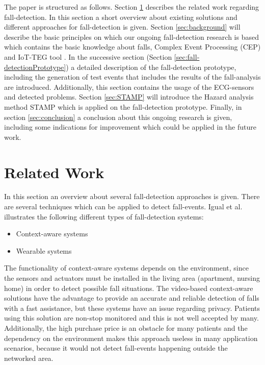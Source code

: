 \documentclass[review]{elsarticle}
\begin{document}
The paper is structured as follows. Section \ref{sec:relatedwork} describes the related work regarding fall-detection. In this section a short overview about existing solutions and different approaches for fall-detection is given. Section \ref{sec:background} will describe the basic principles on which our ongoing fall-detection research is based which contains the basic knowledge about falls, Complex Event Processing (CEP) \cite{Esper:2016} and IoT-TEG tool \cite{Gutierrez2017, TesisGutierrez2017}. In the successive section (Section \ref{sec:fall-detectionPrototype}) a detailed description of the fall-detection prototype, including the generation of test events that includes the results of the fall-analysis are introduced. Additionally, this section contains the usage of the ECG-sensors and detected problems. Section \ref{sec:STAMP} will introduce the Hazard analysis method STAMP \cite{leveson2011engineering} which is applied on the fall-detection prototype.
Finally, in section \ref{sec:conclusion} a conclusion about this ongoing research is given, including some indications for improvement which could be applied in the future work.

\section{Related Work}
\label{sec:relatedwork}
In this section an overview about several fall-detection approaches is given. There are several techniques which can be applied to detect fall-events. Igual et al. \cite{Igual2013} illustrates the following different types of fall-detection  systems:
\begin{itemize}
	\item Context-aware systems
	\item Wearable systems
\end{itemize}
The functionality of context-aware systems depends on the environment, since the sensors and actuators must be installed in the living area (apartment, nursing home) in order to detect possible fall situations. The video-based context-aware solutions have the advantage to provide an accurate and reliable detection of falls with a fast assistance, but these systems have an issue regarding privacy. Patients using this solution are non-stop monitored and this is not well accepted by many. Additionally, the high purchase price is an obstacle for many patients and the dependency on the environment makes this approach useless in many application scenarios, because it would not detect fall-events happening outside the networked area.
\end{document}
